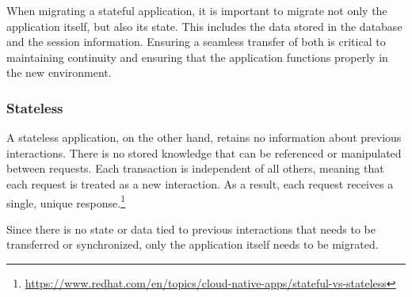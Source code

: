 When migrating a stateful application, it is important to migrate not only the application itself, but also its state. This includes the data stored in the database and the session information. Ensuring a seamless transfer of both is critical to maintaining continuity and ensuring that the application functions properly in the new environment.

\subsubsection{Stateless}
A stateless application, on the other hand, retains no information about previous interactions. There is no stored knowledge that can be referenced or manipulated between requests. Each transaction is independent of all others, meaning that each request is treated as a new interaction. As a result, each request receives a single, unique response.\footnote{\url{https://www.redhat.com/en/topics/cloud-native-apps/stateful-vs-stateless}}

Since there is no state or data tied to previous interactions that needs to be transferred or synchronized, only the application itself needs to be migrated.